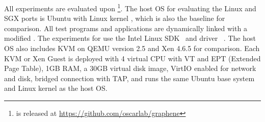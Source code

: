 All experiments are evaluated upon \graphene{} \grapheneversion{}\footnote{\graphene{} is released at \url{https://github.com/oscarlab/graphene}}.
The host OS for evaluating the Linux and SGX ports is Ubuntu \ubuntuversion{} with Linux kernel \linuxversion{},
which is also the baseline for comparison.
All test programs and applications are dynamically linked
with a modified \glibc{} \glibcversion{}.
The experiments for \graphenesgx{}
use the Intel \sgx{} Linux SDK~\cite{intel-sgx-linux-sdk} and driver~\cite{intel-sgx-linux-driver} \sgxdriverversion{}.
The host OS also
includes KVM on QEMU version 2.5 and Xen 4.6.5 for comparison.
Each KVM or Xen Guest is deployed with 4 virtual CPU with VT and EPT (Extended Page Table), 1GB RAM, a 30GB virtual disk image, VirtIO enabled for network and disk, bridged connection with TAP, and runs the same Ubuntu base system and Linux kernel as the host OS.










